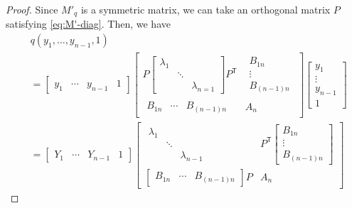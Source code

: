 \documentclass[pdftex,a4paper,12pt]{scrartcl}
\theoremstyle{plain}
\theoremstyle{definition}
\theoremstyle{remark}
\numberwithin{equation}{section}
\begin{document}
\begin{proof}
Since $M'_q$ is a symmetric matrix, we can take an orthogonal matrix $P$ satisfying \eqref{eq:M'-diag}.
Then, we have
\[
\begin{split}
& q(y_1,\dots,y_{n-1},1) \\
&=
\begin{bmatrix}
y_1 & \cdots & y_{n-1} & 1
\end{bmatrix}
\left[
\begin{array}{c|c}
  P
  \begin{bmatrix}
  \lambda_1 && \\
  & \ddots & \\
  && \lambda_{n=1}
  \end{bmatrix}
     P^{\mathsf T}
  &
    \begin{matrix}
    B_{1n} \\ \vdots \\ B_{(n-1)n}
    \end{matrix}
  \\\hline
  \begin{matrix}
  B_{1n} & \cdots & B_{(n-1)n}
  \end{matrix}
      & A_n
\end{array}
\right]
\begin{bmatrix}
y_1 \\ \vdots \\ y_{n-1} \\ 1
\end{bmatrix}
\\
&=
\begin{bmatrix}
Y_1 & \cdots & Y_{n-1} & 1
\end{bmatrix}
\left[
\begin{array}{c|c}
  \begin{matrix}
  \lambda_1 && \\ & \ddots & \\ && \lambda_{n-1}
  \end{matrix}
             & P^{\mathsf T}
               \begin{bmatrix}
               B_{1n} \\ \vdots \\ B_{(n-1)n}
               \end{bmatrix}
  \\\hline
  \begin{bmatrix}
  B_{1n} & \cdots & B_{(n-1)n}
  \end{bmatrix} P
                 & A_n
\end{array}
\right]

\end{split}\]
\end{proof}
\end{document}
